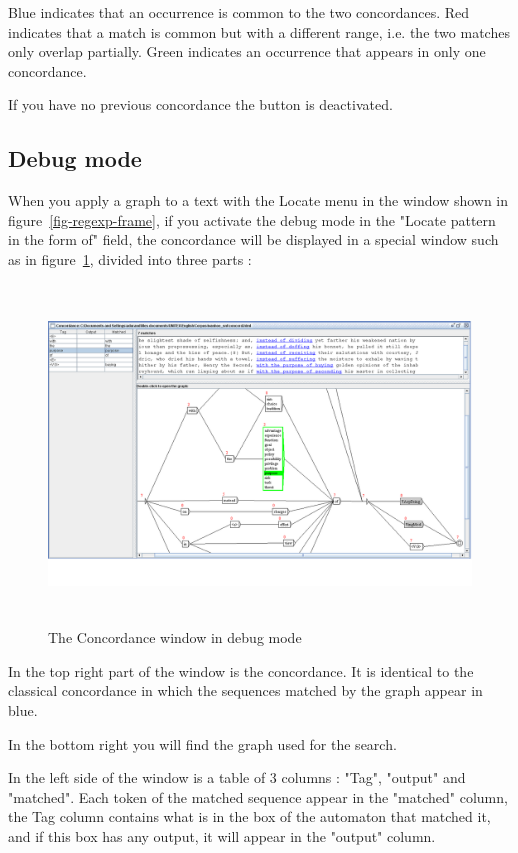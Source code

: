 \bigskip
\noindent Blue indicates that an occurrence is common to the two concordances. Red indicates that a match is common but
with a different range, i.e. the two matches only overlap partially. Green indicates an
occurrence that appears in only one concordance.

\bigskip
\noindent If you have no previous concordance the button is deactivated.

\subsection{Debug mode}
\label{section-debug-mode}
When  you apply a graph to a text with the Locate menu 
in the window shown in figure~\ref{fig-regexp-frame}, 
if you activate the debug mode in the "Locate pattern in the form of" field,
the concordance will be displayed in a special window such as in figure~\ref{fig-debug-mode}, divided into three parts :

\begin{figure}[h]
\begin{center}
\includegraphics[height=9cm]{resources/img/fig6-34.png}
\caption{The Concordance window in debug mode\label{fig-debug-mode}}
\end{center}
\end{figure}

\medskip 
\indent In the top right part of the window is the concordance. It is identical to the classical concordance in which the sequences matched by the graph appear in blue.

\medskip
\indent In the bottom right you will find the graph used for the search.

\medskip
\indent In the left side of the window is a table of 3 columns : "Tag", "output" and "matched".
Each token of the matched sequence appear in the "matched" column, the Tag column contains what is in the box of the automaton that matched it, and if this box has any output, it will appear in the "output" column.

